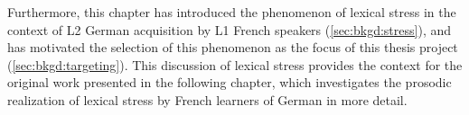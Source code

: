  Furthermore, this chapter has introduced the phenomenon of lexical stress in the context of L2 German acquisition by L1 French speakers (\cref{sec:bkgd:stress}), and has motivated the selection of this phenomenon as the focus of this thesis project (\cref{sec:bkgd:targeting}). This discussion of lexical stress provides the context for the original work presented in the following chapter, which investigates the prosodic realization of lexical stress by French learners of German in more detail.